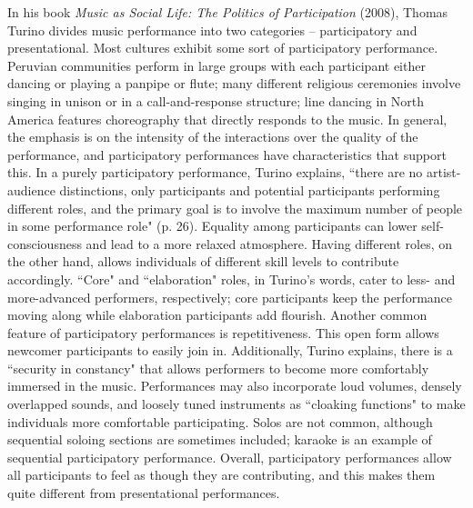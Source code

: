 In his book \textit{Music as Social Life: The Politics of Participation} (2008), Thomas Turino divides music performance into two categories -- participatory and presentational. Most cultures exhibit some sort of participatory performance. Peruvian communities perform in large groups with each participant either dancing or playing a panpipe or flute; many different religious ceremonies involve singing in unison or in a call-and-response structure; line dancing in North America features choreography that directly responds to the music. In general, the emphasis is on the intensity of the interactions over the quality of the performance, and participatory performances have characteristics that support this. In a purely participatory performance, Turino explains, ``there are no artist-audience distinctions, only participants and potential participants performing different roles, and the primary goal is to involve the maximum number of people in some performance role" (p. 26). Equality among participants can lower self-consciousness and lead to a more relaxed atmosphere. Having different roles, on the other hand, allows individuals of different skill levels to contribute accordingly. ``Core" and ``elaboration" roles, in Turino's words, cater to less- and more-advanced performers, respectively; core participants keep the performance moving along while elaboration participants add flourish. Another common feature of participatory performances is repetitiveness. This open form allows newcomer participants to easily join in. Additionally, Turino explains, there is a ``security in constancy" that allows performers to become more comfortably immersed in the music. Performances may also incorporate loud volumes, densely overlapped sounds, and loosely tuned instruments as ``cloaking functions" to make individuals more comfortable participating. Solos are not common, although sequential soloing sections are sometimes included; karaoke is an example of sequential participatory performance. Overall, participatory performances allow all participants to feel as though they are contributing, and this makes them quite different from presentational performances.
